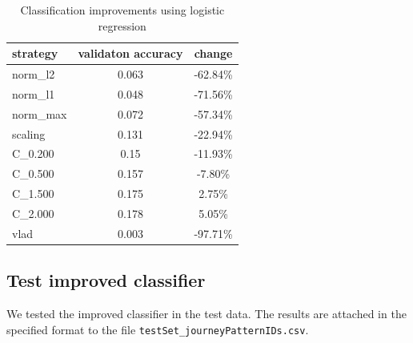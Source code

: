 \documentclass[12pt]{article}
\begin{document}
\begin{table}[H]
	\centering
	\begin{tabular}{|l|c|c|}
		\hline
		strategy & validaton accuracy & change  \\ \hline
		norm\_l2 &  0.063  &  -62.84\%  \\ \hline
		norm\_l1 &  0.048  &  -71.56\%  \\ \hline
		norm\_max &  0.072  &  -57.34\%  \\ \hline
		scaling &  0.131  &  -22.94\%  \\ \hline
		C\_0.200 &  0.15  &  -11.93\%  \\ \hline
		C\_0.500 &  0.157  &  -7.80\%  \\ \hline
		C\_1.500 &  0.175  &  2.75\%  \\ \hline
		C\_2.000 &  0.178  &  5.05\%  \\ \hline
		vlad &  0.003  &  -97.71\%  \\ \hline
		
	\end{tabular}
	\label{impr}
	\caption{Classification improvements using logistic regression}
\end{table}

	\subsection{Test improved classifier}
	
  We tested the improved classifier in the test data. The results are attached
  in the specified format to the file \texttt{testSet\_journeyPatternIDs.csv}.
	
\end{document}
